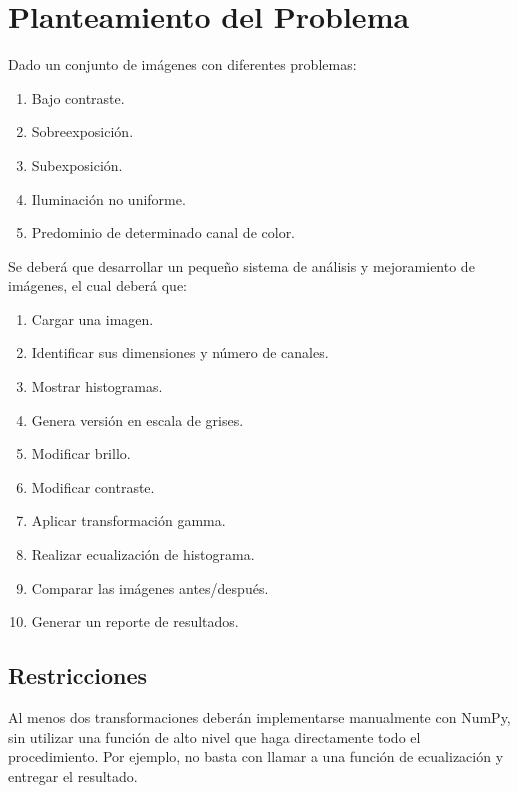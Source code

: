 \section{Planteamiento del Problema}
    Dado un conjunto de imágenes con diferentes problemas:
    \begin{enumerate}[label=\alph*.]
        \item Bajo contraste.
        \item Sobreexposición.
        \item Subexposición.
        \item Iluminación no uniforme.
        \item Predominio de determinado canal de color.
    \end{enumerate}
    Se deberá que desarrollar un pequeño sistema de análisis y mejoramiento de imágenes, 
    el cual deberá que:
    \begin{enumerate}
        \item Cargar una imagen.
        \item Identificar sus dimensiones y número de canales.
        \item Mostrar histogramas.
        \item Genera versión en escala de grises.
        \item Modificar brillo.
        \item Modificar contraste.
        \item Aplicar transformación gamma.
        \item Realizar ecualización de histograma.
        \item Comparar las imágenes antes/después.
        \item Generar un reporte de resultados.
    \end{enumerate}

    \subsection{Restricciones}
        Al menos dos transformaciones deberán implementarse manualmente con NumPy, sin utilizar 
        una función de alto nivel que haga directamente todo el procedimiento. Por ejemplo, no 
        basta con llamar a una función de ecualización y entregar el resultado.